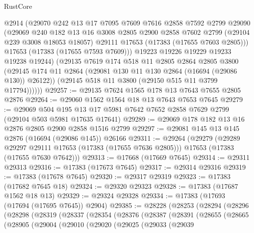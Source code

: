 \begin{lexlean}{RustCore}
\begin{coremodule}
            @2914
            (@29070
              @242
              @13
              @17
              @7095
              @7609
              @7616
              @2858
              @7592
              @2799
              @29090
              (@29069
                @240
                @182
                @13
                @16
                @3008
                @2805
                @2900
                @2858
                @7602
                @2799
                (@29104 @239 @3008 @18053 @18057)
                @29111
                @17653
                (@17383 (@17655 @7603 @2805)))
              @17653
              (@17383 (@17655 @7593 @7609)))
            @19223
            @19226
            @19229
            @19233
            @19238
            @19244)
          (@29135
            @7619
            @174
            @518
            @11
            @2805
            @2864
            @2805
            @3800
            (@29145 @174 @11 @2864 (@29081 @130 @11 @130 @2864 (@16694 (@29086 @130)) @26122))
            (@29145 @518 @11 @3800 (@29150 @515 @11 @3799 @17794))))))
@29257 := @29135 @7624 @1565 @178 @13 @7643 @7655 @2805 @2876
@29264 := @29060 @1562 @1564 @18 @13 @7643 @7653 @7645
@29279 := @29069
    @504
    @195
    @13
    @17
    @5981
    @7642
    @7652
    @2858
    @7629
    @2799
    (@29104 @503 @5981 @17635 @17641)
@29289 := @29069 @178 @182 @13 @16 @2876 @2805 @2900 @2858 @1516 @2799
@29297 := @29081 @145 @13 @145 @2876 (@16694 (@29086 @145)) @26166
@29311 := @29264
    (@29279
      (@29289 @29297 @29111 @17653 (@17383 (@17655 @7636 @2805)))
      @17653
      (@17383 (@17655 @7630 @7642)))
@29313 := @17668 (@17669 @7645)
@29314 := @29311 @29313
@29316 := @17383 (@17673 @7645)
@29317 := @29314 @29316
@29319 := @17383 (@17678 @7645)
@29320 := @29317 @29319
@29323 := @17383 (@17682 @7645 @18)
@29324 := @29320 @29323
@29328 := @17383 (@17687 @1562 @18 @13)
@29329 := @29324 @29328
@29334 := @17383 (@17693 (@17694 (@17695 @7645)) @2904)
@29385 := @28228
    (@28253
      (@28294
        (@28296
          (@28298
            (@28319
              (@28337
                (@28354
                  (@28376
                    (@28387
                      (@28391
                        (@28655
                          (@28665
                            (@28905
                              (@29004
                                (@29010
                                  (@29020
                                    (@29025
                                      (@29033
                                        (@29039

\end{coremodule}
\end{lexlean}
